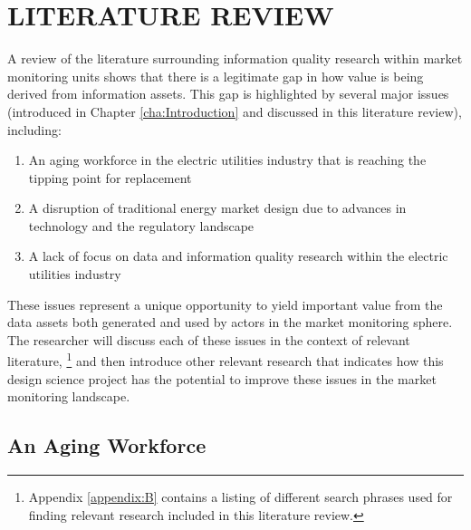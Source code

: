 %
%
%
%  
%



\chapter{\MakeUppercase{Literature Review}}

A review of the literature surrounding information quality research within market monitoring units shows that there is a legitimate gap in how value is being derived from information assets. This gap is highlighted by several major issues (introduced in Chapter \ref{cha:Introduction} and discussed in this literature review), including: 

\begin{enumerate}
    \item{An aging workforce in the electric utilities industry that is reaching the tipping point for replacement}
    \item{A disruption of traditional energy market design due to advances in technology and the regulatory landscape}
    \item{A lack of focus on data and information quality research within the electric utilities industry}
\end{enumerate}

\noindent These issues represent a unique opportunity to yield important value from the data assets both generated and used by actors in the market monitoring sphere. The researcher will discuss each of these issues in the context of relevant literature,
\footnote{Appendix \ref{appendix:B} contains a listing of different search phrases used for finding relevant research included in this literature review.}
and then introduce other relevant research that indicates how this design science project has the potential to improve these issues in the market monitoring landscape.

\section{An Aging Workforce}


